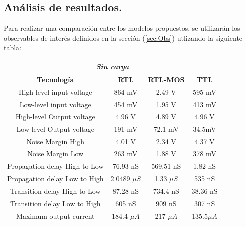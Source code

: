 \subsection{Análisis de resultados.}
Para realizar una comparación entre los modelos propuestos, se utilizarán los observables de interés definidos en la sección (\ref{sec:Obs}) utlizando la siguiente tabla:
\begin{table}[H]
\centering
\begin{tabular}{c|ccc}
\hline
\multicolumn{4}{|c|}{\textit{Sin carga}}                                                                          \\ \hline
\multicolumn{1}{|c|}{\textbf{Tecnología}} & \textbf{RTL}   & \textbf{RTL-MOS} & \multicolumn{1}{c|}{\textbf{TTL}} \\ \hline
High-level input voltage                  & 864 mV         & 2.49 V           & 595 mV                            \\
Low-level input voltage                   & 454 mV         & 1.95 V           & 413 mV                            \\
High-level Output voltage                 & 4.96 V         & 4.89 V           & 4.96 V                            \\
Low-level Output voltage                  & 191 mV         & 72.1 mV          & 34.5mV                            \\
Noise Margin High                         & 4.01 V         & 2.34 V           & 4.37 V                            \\
Noise Margin Low                          & 263 mV         & 1.88 V           & 378 mV                            \\
Propagation delay High to Low             & 76.93 nS       & 569.51 nS        & 1.82 nS                           \\
Propagation delay Low to High             & 2.0489 $\mu S$ & 1.33 $\mu S$     & 535 nS                            \\
Transition delay High to Low              & 87.28 nS       & 734.4 nS         & 38.36 nS                          \\
Transition delay Low to High              & 605 nS         & 909 nS           & 307 nS                            \\
Maximum output current                    & 184.4  $\mu A$ &    217 $\mu A$              &                                  135.5$\mu A$ 	
\end{tabular}
\end{table}
